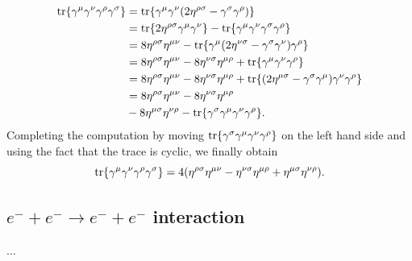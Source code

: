 \begin{equation}
    \begin{split}
        \mathrm{tr}\{\gamma^\mu\gamma^\nu\gamma^\rho\gamma^\sigma\} &= \mathrm{tr}\{\gamma^\mu\gamma^\nu(2\eta^{\rho\sigma} - \gamma^\sigma\gamma^\rho)\} \\
        &= \mathrm{tr}\{2\eta^{\rho\sigma}\gamma^\mu\gamma^\nu\} - \mathrm{tr}\{\gamma^\mu\gamma^\nu\gamma^\sigma\gamma^\rho\} \\
        &= 8\eta^{\rho\sigma}\eta^{\mu\nu} - \mathrm{tr}\{\gamma^\mu(2\eta^{\nu\sigma} - \gamma^\sigma\gamma^\nu)\gamma^\rho\} \\
        &= 8\eta^{\rho\sigma}\eta^{\mu\nu} - 8\eta^{\nu\sigma}\eta^{\mu\rho} + \mathrm{tr}\{\gamma^\mu\gamma^\nu\gamma^\rho\} \\
        &= 8\eta^{\rho\sigma}\eta^{\mu\nu} - 8\eta^{\nu\sigma}\eta^{\mu\rho} + \mathrm{tr}\{(2\eta^{\mu\sigma} - \gamma^\sigma\gamma^\mu)\gamma^\nu\gamma^\rho\} \\
        &= 8\eta^{\rho\sigma}\eta^{\mu\nu} - 8\eta^{\nu\sigma}\eta^{\mu\rho} \\
        &- 8\eta^{\mu\sigma}\eta^{\nu\rho} - \mathrm{tr}\{\gamma^\sigma\gamma^\mu\gamma^\nu\gamma^\rho\}.
    \end{split}
\end{equation}
Completing the computation by moving $\mathrm{tr}\{\gamma^\sigma\gamma^\mu\gamma^\nu\gamma^\rho\}$ on the left hand side and using the fact that the trace is cyclic, we finally obtain 
\begin{equation}
    \mathrm{tr}\{\gamma^\mu\gamma^\nu\gamma^\rho\gamma^\sigma\} = 4(\eta^{\rho\sigma}\eta^{\mu\nu} - \eta^{\nu\sigma}\eta^{\mu\rho} + \eta^{\mu\sigma}\eta^{\nu\rho}).
\end{equation}

\subsection{\texorpdfstring{$e^- + e^- \to e^- + e^-$}{2e- in 2e-} interaction}
...

